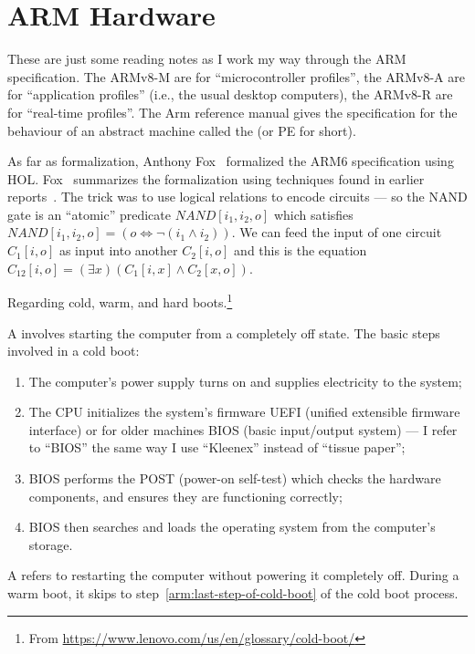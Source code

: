 \chapter{ARM Hardware}


\begin{node}\label{arm-0000}%
These are just some reading notes as I work my way through the ARM
specification. The ARMv8-M are for ``microcontroller profiles'', the
ARMv8-A are for ``application profiles'' (i.e., the usual desktop
computers), the ARMv8-R are for ``real-time profiles''. The Arm
reference manual gives the specification for the behaviour of an
abstract machine called the  (or PE for
short).

As far as formalization, Anthony Fox~\cite{fox2001arm} formalized the ARM6
specification using HOL. Fox~\cite{fox2002arm} summarizes the
formalization using techniques found in earlier reports~\cite{fox2001algebraic}.
The trick was to use logical relations to
encode circuits --- so the NAND gate is an ``atomic'' predicate
$NAND[i_{1},i_{2},o]$ which satisfies
$NAND[i_{1},i_{2},o]=(o\iff\neg(i_{1}\land i_{2}))$. We can feed the
input of one circuit $C_{1}[i,o]$ as input into another $C_{2}[i,o]$ and
this is the equation $C_{12}[i,o]=(\exists x)(C_{1}[i,x]\land C_{2}[x,o])$.
\end{node}

\begin{node}[Definitions]\label{arm-0001}%
Regarding cold, warm, and hard boots.\footnote{From \url{https://www.lenovo.com/us/en/glossary/cold-boot/}}

\begin{node}\label{arm-0002}%
A  involves starting the computer from a completely
off state. The basic steps involved in a cold boot:
\begin{enumerate}
\item The computer's power supply turns on and supplies electricity to
  the system;
\item The CPU initializes the system's firmware UEFI (unified extensible
  firmware interface) or for older machines BIOS (basic
  input/output system) --- I refer to ``BIOS'' the same way I use
  ``Kleenex'' instead of ``tissue paper'';
\item BIOS performs the POST (power-on self-test) which checks the
  hardware components, and ensures they are functioning correctly;
\item\label{arm:last-step-of-cold-boot} BIOS then searches and loads the operating system from the
  computer's storage.
\end{enumerate}
\end{node}

\begin{node}\label{arm-0003}%
A  refers to restarting the computer without powering
it completely off. During a warm boot, it skips to
step~\ref{arm:last-step-of-cold-boot} of the cold boot process.
\end{node}
\end{node} %

